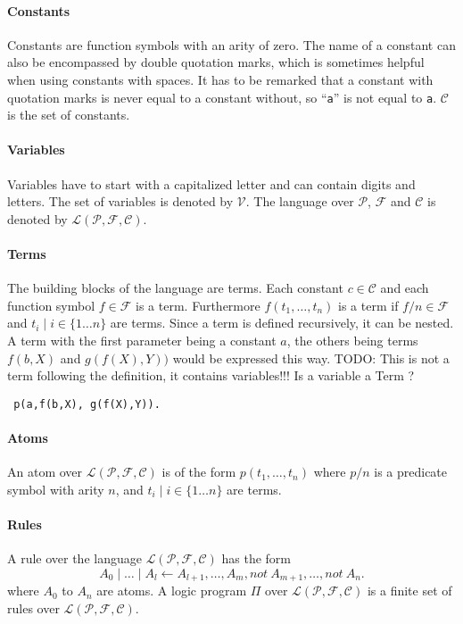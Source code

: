 \documentclass[a4paper,10pt]{article}
\begin{document}
\paragraph{Constants}
Constants are function symbols with an arity of zero.
The name of a constant can also be encompassed by double quotation marks, which is sometimes helpful when using constants with spaces. It has to be remarked that a constant with quotation marks is never equal to a constant without, so ``\texttt{a}'' is not equal to \texttt{a}.
$\mathcal{C}$ is the set of constants.
\paragraph{Variables}
Variables have to start with a capitalized letter and can contain digits and letters.
The set of variables is denoted by $\mathcal{V}$.
The language over $\mathcal{P}$, $\mathcal{F}$ and $\mathcal{C}$ is denoted by $\mathcal{L(P,F,C)}$.
\paragraph{Terms}
The building blocks of the language are terms.
Each constant $c \in \mathcal{C}$ and each function symbol $f \in \mathcal{F}$ is a term.
Furthermore $f(t_1, \dots, t_n)$ is a term if $f/n \in \mathcal{F}$ and $t_i \mid i \in \{1 \dots n\}$ are terms.
Since a term is defined recursively, it can be nested.
A term with the first parameter being a constant $a$, the others being terms $f(b,X)$ and $g(f(X), Y))$ would be expressed this way.
\newline
TODO: This is not a term following the definition, it contains variables!!! Is a variable a Term ?
\begin{verbatim}
 p(a,f(b,X), g(f(X),Y)).
\end{verbatim}
\paragraph{Atoms}
An atom over $\mathcal{L(P, F, C)}$ is of the form $p(t_1, \dots, t_n)$ where $p/n$ is a predicate
symbol with arity $n$, and $t_i \mid i \in \{1 \dots n\}$ are terms.
\paragraph{Rules}
A rule over the language $\mathcal{L(P,F,C)}$ has the form
$$
A_0 \mid \dots \mid A_l \leftarrow A_{l+1}, \dots, A_m, not\ A_{m+1}, \dots, not\ A_n.
$$
where $A_0$ to $A_n$ are atoms. \newline
A logic program $\Pi$ over $\mathcal{L(P,F,C)}$ is a finite set of rules over $\mathcal{L(P,F,C)}$.
\end{document}
